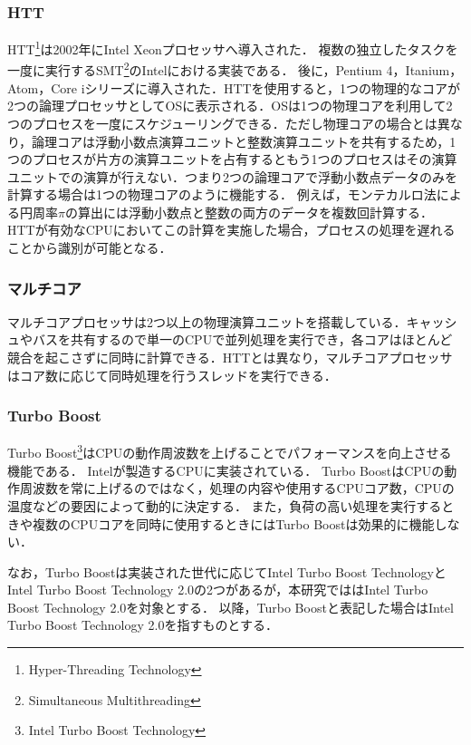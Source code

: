 \subsubsection{HTT}
HTT\footnote{Hyper-Threading Technology}は2002年にIntel Xeonプロセッサへ導入された．
複数の独立したタスクを一度に実行するSMT\footnote{Simultaneous Multithreading}のIntelにおける実装である．
後に，Pentium 4，Itanium，Atom，Core iシリーズに導入された．HTTを使用すると，1つの物理的なコアが2つの論理プロセッサとしてOSに表示される．OSは1つの物理コアを利用して2つのプロセスを一度にスケジューリングできる．ただし物理コアの場合とは異なり，論理コアは浮動小数点演算ユニットと整数演算ユニットを共有するため，1つのプロセスが片方の演算ユニットを占有するともう1つのプロセスはその演算ユニットでの演算が行えない．つまり2つの論理コアで浮動小数点データのみを計算する場合は1つの物理コアのように機能する．
例えば，モンテカルロ法による円周率$\pi$の算出には浮動小数点と整数の両方のデータを複数回計算する．
HTTが有効なCPUにおいてこの計算を実施した場合，プロセスの処理を遅れることから識別が可能となる．

\subsubsection{マルチコア}
マルチコアプロセッサは2つ以上の物理演算ユニットを搭載している．キャッシュやバスを共有するので単一のCPUで並列処理を実行でき，各コアはほとんど競合を起こさずに同時に計算できる．HTTとは異なり，マルチコアプロセッサはコア数に応じて同時処理を行うスレッドを実行できる．

\subsubsection{Turbo Boost}
Turbo Boost\footnote{Intel Turbo Boost Technology}はCPUの動作周波数を上げることでパフォーマンスを向上させる機能である．
Intelが製造するCPUに実装されている．
Turbo BoostはCPUの動作周波数を常に上げるのではなく，処理の内容や使用するCPUコア数，CPUの温度などの要因によって動的に決定する．
また，負荷の高い処理を実行するときや複数のCPUコアを同時に使用するときにはTurbo Boostは効果的に機能しない．

なお，Turbo Boostは実装された世代に応じてIntel Turbo Boost TechnologyとIntel Turbo Boost Technology 2.0の2つがあるが，本研究でははIntel Turbo Boost Technology 2.0を対象とする．
以降，Turbo Boostと表記した場合はIntel Turbo Boost Technology 2.0を指すものとする．

